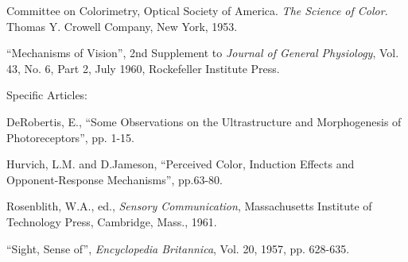 \small
Committee on Colorimetry, Optical Society of America. \textit{The Science of Color}. Thomas Y. Crowell Company, New York, 1953.

“Mechanisms of Vision”, 2nd Supplement to \textit{Journal of General Physiology}, Vol. 43, No. 6, Part 2, July 1960, Rockefeller Institute Press.

Specific Articles:

DeRobertis, E., “Some Observations on the Ultrastructure and Morphogenesis of Photoreceptors”, pp. 1-15.

Hurvich, L.M. and D.Jameson, “Perceived Color, Induction Effects and Opponent-Response Mechanisms”, pp.63-80.

Rosenblith, W.A., ed., \textit{Sensory Communication}, Massachusetts Institute of Technology Press, Cambridge, Mass., 1961.

“Sight, Sense of”, \textit{Encyclopedia Britannica}, Vol. 20, 1957, pp. 628-635.

\normalsize
